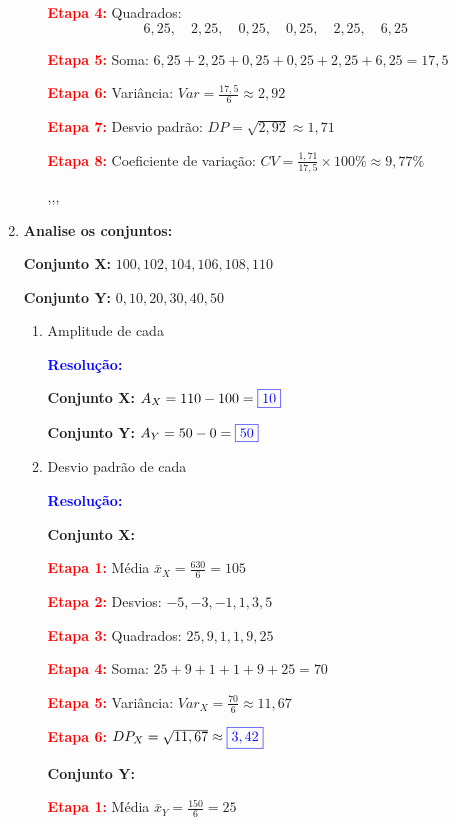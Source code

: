 \documentclass[11pt]{article}
\newcommand{\respostaNum}[1]{\textcolor{blue}{\boxed{#1}}}
\newcommand{\resolucao}{\textbf{\textcolor{blue}{Resolução:}}}
\begin{document}
\begin{multicols}{2}
\begin{enumerate}[leftmargin=*]
\begin{enumerate}[label=\alph*)]
\textbf{\textcolor{red}{Etapa 4:}} Quadrados:
\[
6,25,\quad 2,25,\quad 0,25,\quad 0,25,\quad 2,25,\quad 6,25
\]

\textbf{\textcolor{red}{Etapa 5:}} Soma: $6,25 + 2,25 + 0,25 + 0,25 + 2,25 + 6,25 = 17,5$

\textbf{\textcolor{red}{Etapa 6:}} Variância: $Var = \frac{17,5}{6} \approx 2,92$

\textbf{\textcolor{red}{Etapa 7:}} Desvio padrão: $DP = \sqrt{2,92} \approx 1,71$

\textbf{\textcolor{red}{Etapa 8:}} Coeficiente de variação: $CV = \frac{1,71}{17,5} \times 100\% \approx 9,77\%$

\respostaNum{5},\quad \respostaNum{2,92},\quad \respostaNum{1,71},\quad \respostaNum{9,77\%}
\end{enumerate}

\item \textbf{Analise os conjuntos:}

\textbf{Conjunto X:} $100, 102, 104, 106, 108, 110$

\textbf{Conjunto Y:} $0, 10, 20, 30, 40, 50$

\begin{enumerate}[label=\alph*)]
\item Amplitude de cada

\resolucao

\textbf{Conjunto X:} $A_X = 110 - 100 = \respostaNum{10}$

\textbf{Conjunto Y:} $A_Y = 50 - 0 = \respostaNum{50}$

\item Desvio padrão de cada

\resolucao

\textbf{Conjunto X:}

\textbf{\textcolor{red}{Etapa 1:}} Média $\bar{x}_X = \frac{630}{6} = 105$

\textbf{\textcolor{red}{Etapa 2:}} Desvios: $-5, -3, -1, 1, 3, 5$

\textbf{\textcolor{red}{Etapa 3:}} Quadrados: $25, 9, 1, 1, 9, 25$

\textbf{\textcolor{red}{Etapa 4:}} Soma: $25+9+1+1+9+25 = 70$

\textbf{\textcolor{red}{Etapa 5:}} Variância: $Var_X = \frac{70}{6} \approx 11,67$

\textbf{\textcolor{red}{Etapa 6:}} $DP_X = \sqrt{11,67} \approx \respostaNum{3,42}$

\textbf{Conjunto Y:}

\textbf{\textcolor{red}{Etapa 1:}} Média $\bar{x}_Y = \frac{150}{6} = 25$


\end{enumerate}
\end{enumerate}
\end{multicols}
\end{document}
